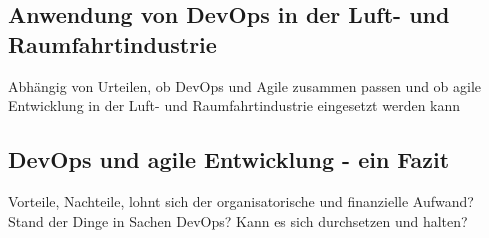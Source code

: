 \subsection{Anwendung von DevOps in der Luft- und Raumfahrtindustrie}
Abhängig von Urteilen, ob DevOps und Agile zusammen passen und ob agile Entwicklung in der
Luft- und Raumfahrtindustrie eingesetzt werden kann

\subsection{DevOps und agile Entwicklung - ein Fazit}
Vorteile, Nachteile, lohnt sich der organisatorische und finanzielle Aufwand?
Stand der Dinge in Sachen DevOps? Kann es sich durchsetzen und halten?
